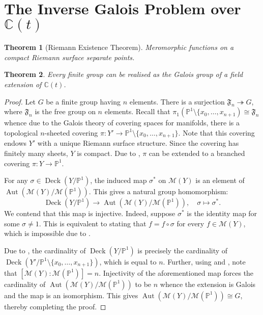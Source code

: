 \documentclass[12pt]{article}
\theoremstyle{thmstyle}
\newtheorem{theorem}{Theorem}[section]
\theoremstyle{defstyle}
\newcommand{\bbC}{\mathbb{C}}
\newcommand{\Aut}{\operatorname{Aut}}
\newcommand{\onto}{\twoheadrightarrow}
\newcommand{\bbP}{\mathbb{P}}
\newcommand{\scrM}{\mathscr{M}}
\begin{document}
\section{The Inverse Galois Problem over \texorpdfstring{$\bbC(t)$}{C(t)}}

\begin{theorem}[Riemann Existence Theorem]
    Meromorphic functions on a compact Riemann surface separate points.
\end{theorem}

\begin{theorem}
    Every finite group can be realised as the Galois group of a field extension of $\bbC(t)$.
\end{theorem}
\begin{proof}
    Let $G$ be a finite group having $n$ elements. There is a surjection $\mathfrak F_n\onto G$, where $\mathfrak F_n$ is the free group on $n$ elements. Recall that $\pi_1\left(\bbP^1\setminus\{x_0,\dots, x_{n + 1}\right)\cong\mathfrak F_n$ whence due to the Galois theory of covering spaces for manifolds, there is a topological $n$-sheeted covering $\pi: Y'\to\bbP^1\setminus\{x_0,\dots, x_{n + 1}\}$. Note that this covering endows $Y'$ with a unique Riemann surface structure. Since the covering has finitely many sheets, $Y$ is compact. Due to , $\pi$ can be extended to a branched covering $\pi: Y\to\bbP^1$. 

    For any $\sigma\in\operatorname{Deck}(Y/\bbP^1)$, the induced map $\sigma^\ast$ on $\scrM(Y)$ is an element of $\Aut(\scrM(Y)/\scrM(\bbP^1))$. This gives a natural group homomorphism:
    \begin{equation*}
        \operatorname{Deck}(Y/\bbP^1)\longrightarrow\Aut(\scrM(Y)/\scrM(\bbP^1)),\quad\sigma\mapsto\sigma^\ast.
    \end{equation*}
    We contend that this map is injective. Indeed, suppose $\sigma^\ast$ is the identity map for some $\sigma\ne 1$. This is equivalent to stating that $f = f\circ\sigma$ for every $f\in\scrM(Y)$, which is impossible due to .

    Due to , the cardinality of $\operatorname{Deck}(Y/\bbP^1)$ is precisely the cardinality of $\operatorname{Deck}(Y'/\bbP^1\setminus\{x_0,\dots, x_{n + 1}\})$, which is equal to $n$. Further, using  and , note that $[\scrM(Y) : \scrM(\bbP^1)] = n$. Injectivity of the aforementioned map forces the cardinality of $\Aut(\scrM(Y)/\scrM(\bbP^1))$ to be $n$ whence the extension is Galois and the map is an isomorphism. This gives $\Aut(\scrM(Y)/\scrM(\bbP^1))\cong G$, thereby completing the proof.
\end{proof}
\end{document}
